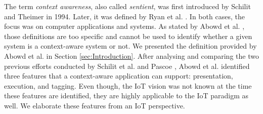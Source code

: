 \documentclass[journal]{IEEEtran}
\begin{document}
 
 The term \textit{context awareness}, also called \textit{sentient}, was first introduced by Schilit and Theimer  \cite{P173}  in 1994. Later, it was defined  by Ryan et al.  \cite{P182}. In both cases, the focus was on computer applications and systems. As stated by Abowd et al.  \cite{P104}, those definitions  are too specific and cannot be used to identify whether a given system is a context-aware  system or not. We presented the definition provided by Abowd et al.  \cite{P104} in Section \ref{sec:Introduction}.  After analysing and comparing the two previous efforts conducted  by Schilit et al.  \cite{P116} and Pascoe \cite{P180}, Abowd et al. \cite{P104} identified three features that a context-aware  application  can support:  presentation,  execution, and tagging. Even though, the IoT vision was  not known at the time these  features  are identified,  they are highly applicable to the IoT paradigm  as well. We elaborate these features from an IoT perspective.
 




 
 

 
 

 
 
 
 
\end{document}
